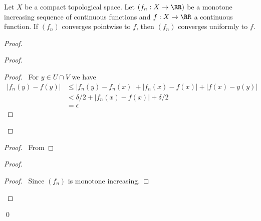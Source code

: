 \begin{theorem}
    Let $X$ be a compact topological space. Let $(f_n : X \rightarrow \RR)$ be a monotone increasing sequence of continuous functions and $f : X \rightarrow \RR$
    a continuous function. If $(f_n)$ converges pointwise to $f$, then $(f_n)$ converges uniformly to $f$.
\end{theorem}

\begin{proof}
    \pf
    \begin{proof}
        \begin{proof}
            \pf\ For $y \in U \cap V$ we have
            \begin{align*}
                |f_n(y) - f(y)| & \leq |f_n(y) - f_n(x)| + |f_n(x) - f(x)| + |f(x) - y(y)| \\
                & < \delta / 2 + |f_n(x) - f(x)| + \delta / 2 \\
                & = \epsilon
            \end{align*}
        \end{proof}
    \end{proof}
    \begin{proof}
        \pf\ From 
    \end{proof}
    \begin{proof}
        \begin{proof}
            \pf\ Since $(f_n)$ is monotone increasing.
        \end{proof}
    \end{proof}
    \qed
\end{proof}

